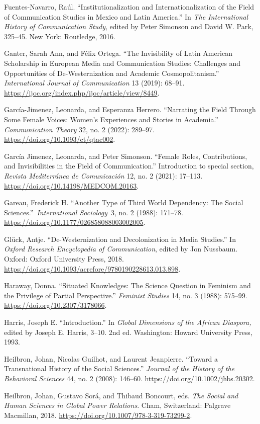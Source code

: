 \documentclass{tufte-handout}
\begin{document}
\begin{hangparas}{.25in}{1}
Fuentes-Navarro, Raúl. ``Institutionalization and Internationalization
of the Field of Communication Studies in Mexico and Latin America.'' In
\emph{The International History of Communication Study}, edited by Peter
Simonson and David W. Park, 325--45. New York: Routledge, 2016.

Ganter, Sarah Ann, and Félix Ortega. ``The Invisibility of Latin
American Scholarship in European Media and Communication Studies:
Challenges and Opportunities of De-Westernization and Academic
Cosmopolitanism.'' \emph{International Journal of Communication} 13
(2019): 68--91. \url{https://ijoc.org/index.php/ijoc/article/view/8449}.

García-Jimenez, Leonarda, and Esperanza Herrero. ``Narrating the Field
Through Some Female Voices: Women's Experiences and Stories in
Academia.'' \emph{Communication Theory} 32, no. 2 (2022): 289--97.
\url{https://doi.org/10.1093/ct/qtac002}.

García Jimenez, Leonarda, and Peter Simonson. ``Female Roles,
Contributions, and Invisibilities in the Field of Communication.''
Introduction to special section, \emph{Revista Mediterránea de
Comunicación} 12, no. 2 (2021): 17--113.
\url{https://doi.org/10.14198/MEDCOM.20163}.

Gareau, Frederick H. ``Another Type of Third World Dependency: The
Social Sciences.''~\emph{International Sociology}~3, no. 2 (1988):
171--78. \url{https://doi.org/10.1177/026858088003002005}.

Glück, Antje. ``De-Westernization and Decolonization in Media Studies.''
In \emph{Oxford Research Encyclopedia of Communication}, edited by Jon
Nussbaum. Oxford: Oxford University Press, 2018.
\url{https://doi.org/10.1093/acrefore/9780190228613.013.898}.

Haraway, Donna. ``Situated Knowledges: The Science Question in Feminism
and the Privilege of Partial Perspective.'' \emph{Feminist Studies} 14,
no. 3 (1988): 575--99. \url{https://doi.org/10.2307/3178066}.

Harris, Joseph E. ``Introduction.'' In \emph{Global Dimensions of the
African Diaspora,} edited by Joseph E. Harris, 3--10. 2nd ed.
Washington: Howard University Press, 1993.

Heilbron, Johan, Nicolas Guilhot, and Laurent Jeanpierre. ``Toward a
Transnational History of the Social Sciences.'' \emph{Journal of the
History of the Behavioral Sciences} 44, no. 2 (2008): 146--60.
\url{https://doi.org/10.1002/jhbs.20302}.

Heilbron, Johan, Gustavo Sorá, and Thibaud Boncourt, eds. \emph{The
Social and Human Sciences in Global Power Relations}. Cham, Switzerland:
Palgrave Macmillan, 2018.
\url{https://doi.org/10.1007/978-3-319-73299-2}.


\end{hangparas}
\end{document}
